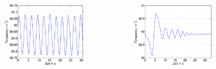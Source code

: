 \begin{frame}
\begin{columns}[c]
\begin{figure}[H]
\begin{center}
                \includegraphics[scale=0.3]{./img/plots/2f_4_6.eps}
        \end{center}
        \end{figure}
        \begin{figure}[H]
        \begin{center}
                \includegraphics[scale=0.2]{./img/plots/2f_4_6_td1.eps}
        \end{center}
        \end{figure}
     \end{columns}
\end{frame}

